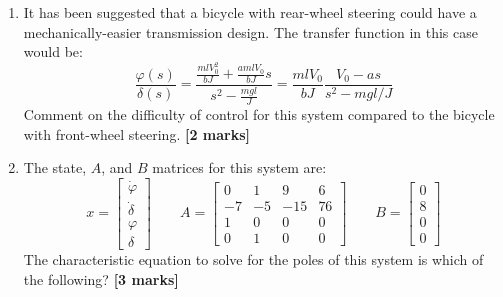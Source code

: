 \documentclass{article}
\begin{document}
\begin{enumerate}[resume]
    \begin{enumerate}
        \item \textbf{{$V_0^2>bg/k_1$}}
        \item {$V_0^2<bg/k_1$}
        \item {$V_0/a<0$}
        \item {$V_0/a>0$}
        \item {Always}
        \item {Never}
        \item {None of the above.}
    \end{enumerate}
    

    \item It has been suggested that a bicycle with rear-wheel steering could have a mechanically-easier transmission design. The transfer function in this case would be:
        \[
          \frac{\varphi(s)}{\delta(s)} = \frac{\frac{mlV_0^2}{bJ} + \frac{amlV_0}{bJ}s}{s^2 - \frac{mgl}{J}}
          = \frac{mlV_0}{bJ}\frac{{V_0} - {a}s}{s^2 - mgl/J}
        \]
    Comment on the difficulty of control for this system compared to the bicycle with front-wheel steering.
    \textbf{[2 marks]}

    \item The state, $A$, and $B$ matrices for this system are:
        \[
        x=\begin{bmatrix}
        \dot \varphi \\
        \dot \delta \\
        \varphi \\
        \delta
        \end{bmatrix}\qquad
        A=\begin{bmatrix}
        0 & 1 & 9 & 6 \\
        -7 & -5 & -15 & 76 \\
        1 & 0 & 0 & 0 \\
        0 & 1 & 0 & 0   
        \end{bmatrix}\qquad
        B = \begin{bmatrix}
        0 \\ 8 \\ 0 \\ 0
        \end{bmatrix}
        \]
    The characteristic equation to solve for the poles of this system is which of the following? \textbf{[3 marks]}
    \begin{enumerate}
        

\end{enumerate}
\end{enumerate}
\end{document}
